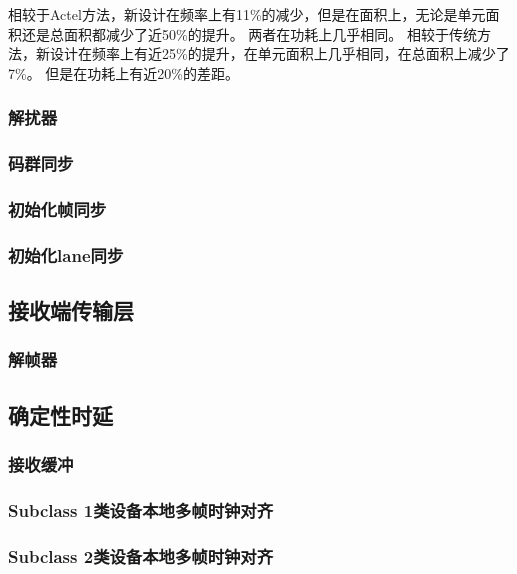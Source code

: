 \documentclass[UTF8]{ctexart}
\begin{document}
相较于Actel方法，新设计在频率上有11\%的减少，但是在面积上，无论是单元面积还是总面积都减少了近50\%的提升。
两者在功耗上几乎相同。
相较于传统方法，新设计在频率上有近25\%的提升，在单元面积上几乎相同，在总面积上减少了7\%。
但是在功耗上有近20\%的差距。


\subsubsection{解扰器}

\subsubsection{码群同步}

\subsubsection{初始化帧同步}

\subsubsection{初始化lane同步}

\subsection{接收端传输层}

\subsubsection{解帧器}

\subsection{确定性时延}

\subsubsection{接收缓冲}

\subsubsection{Subclass 1类设备本地多帧时钟对齐}

\subsubsection{Subclass 2类设备本地多帧时钟对齐}


\end{document}
